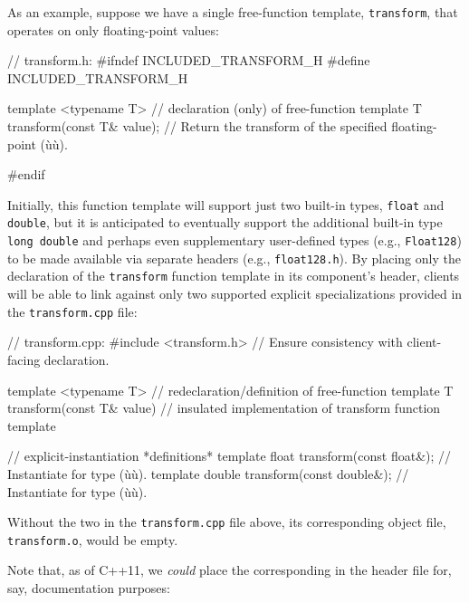 As an example, suppose we have a single free-function template,
\lstinline!transform!, that operates on only floating-point values:

\begin{emcppslisting}[emcppsbatch=e6]
// transform.h:
#ifndef INCLUDED_TRANSFORM_H
#define INCLUDED_TRANSFORM_H

template <typename T>  // declaration (only) of free-function template
T transform(const T& value);
    // Return the transform of the specified floating-point (ù{}ù).

#endif
\end{emcppslisting}

\noindent Initially, this function template will support just two built-in types,
\lstinline!float! and \lstinline!double!, but it is anticipated to eventually
support the additional built-in type \lstinline!long!~\lstinline!double! and
perhaps even supplementary user-defined types (e.g., \lstinline!Float128!)
to be made available via separate headers (e.g., \lstinline!float128.h!).
By placing only the declaration of the \lstinline!transform! function
template in its component's header, clients will be able to link against
only two supported explicit specializations provided in the
\lstinline!transform.cpp! file:

\begin{emcppslisting}[emcppsbatch=e6]
// transform.cpp:
#include <transform.h>  // Ensure consistency with client-facing declaration.

template <typename T>   // redeclaration/definition of free-function template
T transform(const T& value)
{
    // insulated implementation of transform function template
}

// explicit-instantiation *definitions*
template float transform(const float&);    // Instantiate for type (ù{}ù).
template double transform(const double&);  // Instantiate for type (ù{}ù).
\end{emcppslisting}

\noindent Without the two  in
the \lstinline!transform.cpp! file above, its corresponding object file,
\lstinline!transform.o!, would be empty.

Note that, as of C++11, we \emph{could} place the corresponding
 in the header file
for, say, documentation purposes:

